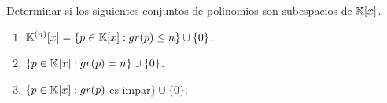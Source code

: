 \item Determinar si los siguientes conjuntos de polinomios son subespacios de $\mathbb{K}[x]$.
    \begin{enumerate}
        \item $\mathbb{K}^{(n)}[x]=\{p\in\mathbb{K}[x]:gr(p)\leq n\}\cup\{0\}$.
            \begin{mdframed}[style=s]
            
            \end{mdframed}
        \item $\{p\in\mathbb{K}[x]:gr(p)=n\}\cup\{0\}$.
            \begin{mdframed}[style=s]
            
            \end{mdframed}
        \item $\{p\in\mathbb{K}[x]:gr(p)$ es impar$\}\cup\{0\}$.
            \begin{mdframed}[style=s]
            
            \end{mdframed}
    \end{enumerate}
